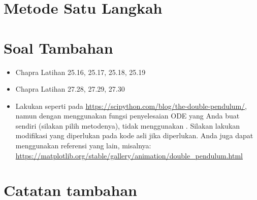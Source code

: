 \section{Metode Satu Langkah}











\section{Soal Tambahan}

\begin{itemize}
\item Chapra Latihan 25.16, 25.17, 25.18, 25.19
\item Chapra Latihan 27.28, 27.29, 27.30
\item Lakukan seperti pada {\footnotesize \url{https://scipython.com/blog/the-double-pendulum/}},
namun dengan menggunakan fungsi penyelesaian ODE yang Anda buat sendiri (silakan pilih
metodenya), tidak menggunakan . Silakan lakukan modifikasi yang diperlukan
pada kode asli jika diperlukan.
Anda juga dapat menggunakan referensi yang lain, misalnya:
{\footnotesize \url{https://matplotlib.org/stable/gallery/animation/double_pendulum.html}}
\end{itemize}


\section*{Catatan tambahan}




